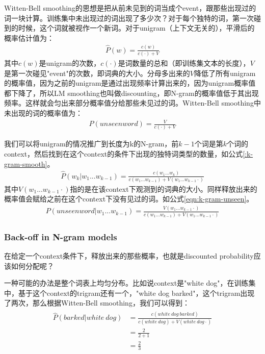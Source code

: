 Witten-Bell smoothing的思想是把从前未见到的词当成个event，跟那些出现过的词一块计算。训练集中未出现过的词出现了多少次？对于每个独特的词，第一次碰到的时候，这个词就被视作一个新词。对于unigram（上下文无关的），平滑后的概率估计值为：
\begin{align}
\label{eqn:uni-smooth}
\hat{P}(w) = \frac{c(w)}{c(\cdot)+V}
\end{align}
其中$c(w)$是unigram的次数，$c(\cdot)$是词数量的总和（即训练集文本的长度），$V$是第一次碰见"event"的次数，即词典的大小。分母多出来的$V$降低了所有unigram的概率值，因为之前的unigram是通过出现频率计算出来的，因为unigram概率值都下降了，所以LM smoothing也叫做discounting，即N-gram的概率值低于其出现频率。这样就会匀出来部分概率值分给那些未见过的词。Witten-Bell smoothing中未出现的词的概率值为：
\begin{align}
\label{eqn:uni-smooth}
P(unseenword) = \frac{V}{c(\cdot)+V}
\end{align}

我们可以将unigram的情况推广到长度为k的N-gram，前$k-1$个词是第$k$个词的context，然后找到在这个context的条件下出现的独特词类型的数量，如公式\ref{:k-gram-smooth}。
\begin{align}
\label{eqn:k-gram-smooth}
\hat{P}(w_k|w_1...w_{k-1}) = \frac{c(w_{1}...w_{k})}{c(w_{1}...w_{k-1})+V(w_{1}...w_{k-1}\cdot)}
\end{align}
其中$V(w_{1}...w_{k-1}\cdot)$指的是在该context下观测到的词典的大小。同样释放出来的概率值会赋给之前在这个context下没有见过的词。如公式\ref{eqn:k-gram-unseen}。
\begin{align}
\label{eqn:k-gram-unseen}
P(unseenword|w_1...w_{k-1}) = \frac{V(w_{1}...w_{k-1}\cdot)}{c(w_{1}...w_{k-1})+V(w_{1}...w_{k-1}\cdot)}
\end{align}

\subsubsection{Back-off in N-gram models}
在给定一个context条件下，释放出来的那些概率，也就是discounted probability应该如何分配呢？

一种可能的办法是整个词表上均匀分布。比如说context是"white dog"，在训练集中，基于这个context的trigram还有一个，"white dog barked"，这个trigram出现了两次，那么根据Witten-Bell smoothing，我们可以得到：
\begin{align}\nonumber
\begin{split}
\hat{P}(barked|white\ dog) &= \frac{c(white\ dog\ barked)}{c(white\ dog) + V(white\ dog\cdot)} \\
													 &= \frac{2}{2+1} \\
													 &= \frac{2}{3}
\end{split}
\end{align}

